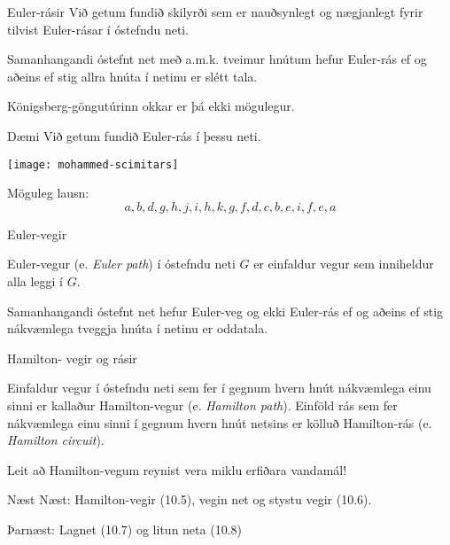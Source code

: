 \documentclass[handout]{beamer}
\begin{document}
\begin{frame}{Euler-rásir}
Við getum fundið skilyrði sem er nauðsynlegt og nægjanlegt fyrir tilvist Euler-rásar í óstefndu neti.

\begin{tcolorbox}
Samanhangandi óstefnt net með a.m.k. tveimur hnútum hefur Euler-rás ef og aðeins ef stig allra hnúta í netinu er slétt tala.
\end{tcolorbox}

Königsberg-göngutúrinn okkar er þá ekki mögulegur.
\end{frame}

\begin{frame}{Dæmi}
Við getum fundið Euler-rás í þessu neti.
\begin{center}
\texttt{[image: mohammed-scimitars]}
\end{center}
\pause
Möguleg lausn:
\[
a, b, d, g, h, j, i, h, k, g, f, d, c, b, e, i, f, e, a
\]

\end{frame}

\begin{frame}{Euler-vegir}
\begin{tcolorbox}[title=Euler-vegur]
Euler-vegur (e. \emph{Euler path}) í óstefndu neti $G$ er einfaldur vegur sem inniheldur alla leggi í $G$.
\end{tcolorbox}

\begin{tcolorbox}
Samanhangandi óstefnt net hefur Euler-veg og ekki Euler-rás ef og aðeins ef stig nákvæmlega tveggja hnúta í netinu er oddatala.
\end{tcolorbox}
\end{frame}

\begin{frame}{Hamilton- vegir og rásir}
    \begin{tcolorbox}[title=Hamilton-vegir og rásir]
    Einfaldur vegur í óstefndu neti sem fer í gegnum hvern hnút nákvæmlega einu sinni er kallaður Hamilton-vegur (e. \emph{Hamilton path}). Einföld rás sem fer nákvæmlega einu sinni í gegnum hvern hnút netsins er kölluð Hamilton-rás (e. \emph{Hamilton circuit}).
    \end{tcolorbox}
    Leit að Hamilton-vegum reynist vera miklu erfiðara vandamál!
\end{frame}

\begin{frame}{Næst}
Næst: Hamilton-vegir (10.5), vegin net og stystu vegir (10.6).

Þarnæst: Lagnet (10.7) og litun neta (10.8)
\end{frame}
\end{document}
